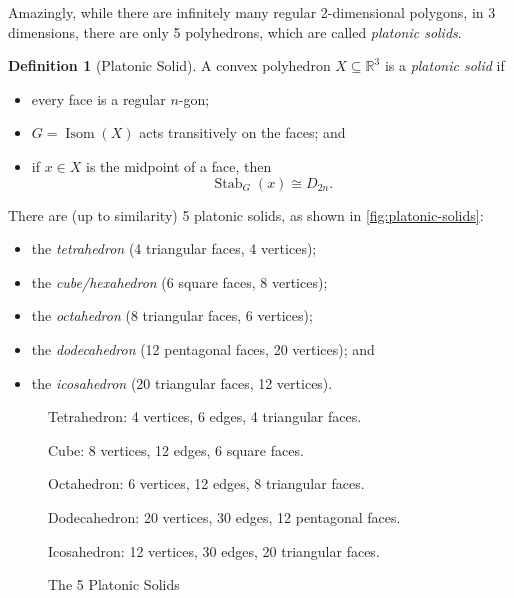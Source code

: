 \documentclass{article}
\theoremstyle{definition}
\newtheorem{definition}[theorem]{Definition}
\theoremstyle{remark}
\newcommand{\pqty}[1]{\left(#1\right)}
\newcommand{\isomorphic}{\cong}
\newcommand{\RR}{\mathbb{R}}
\newcommand{\Stab}{\operatorname{Stab}}
\newcommand{\Isom}{\operatorname{Isom}}
\begin{document}
Amazingly, while there are infinitely many regular 2-dimensional polygons, in 3 dimensions, there are only 5 polyhedrons, which are called \emph{platonic solids}.

\begin{definition}[Platonic Solid]
    \label{def:platonic-solid}%
    A convex polyhedron \(X \subseteq \RR^3\) is a \emph{platonic solid} if
    \begin{itemize}
        \item every face is a regular \(n\)-gon;
        \item \(G = \Isom\pqty{X}\) acts transitively on the faces; and
        \item if \(x \in X\) is the midpoint of a face, then
        \[
            \Stab_{G} \pqty{x} \isomorphic D_{2n}.
        \]
    \end{itemize}
\end{definition}

There are (up to similarity) 5 platonic solids, as shown in \autoref{fig:platonic-solids}:
\begin{itemize}
    \item the \emph{tetrahedron} (4 triangular faces, 4 vertices);
    \item the \emph{cube/hexahedron} (6 square faces, 8 vertices);
    \item the \emph{octahedron} (8 triangular faces, 6 vertices);
    \item the \emph{dodecahedron} (12 pentagonal faces, 20 vertices); and
    \item the \emph{icosahedron} (20 triangular faces, 12 vertices).
\end{itemize}

\begin{figure}[ht!]
    \centering
    \par Tetrahedron: 4 vertices, 6 edges, 4 triangular faces.\par

    \par Cube: 8 vertices, 12 edges, 6 square faces.\par

    \par Octahedron: 6 vertices, 12 edges, 8 triangular faces.\par

    \par Dodecahedron: 20 vertices, 30 edges, 12 pentagonal faces.\par

    \par Icosahedron: 12 vertices, 30 edges, 20 triangular faces.\par

    \caption{The 5 Platonic Solids}
    \label{fig:platonic-solids}
\end{figure}
\end{document}
